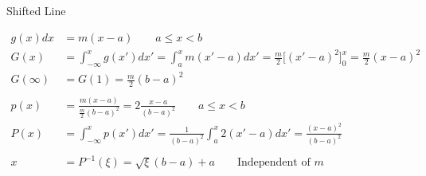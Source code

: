 \documentclass[xcolor=x11names,compress]{beamer}
\renewcommand{\(}{\begin{columns}}
\renewcommand{\)}{\end{columns}}
\newcommand{\<}[1]{\begin{column}{#1}}
\renewcommand{\>}{\end{column}}
\begin{document}
\begin{frame}{Shifted Line}

\[
  \begin{aligned}
  g(x) dx &= m(x - a) \qquad a \leq x < b\\
  G(x) &= \int_{-\infty}^x g(x')dx' = \int_a^x m(x'-a) dx' = \frac{m}{2}\bigl[(x'-a)^2 \bigr]_0^x = \frac{m}{2} (x-a)^2\\
    G(\infty) &= G(1) = \frac{m}{2}(b-a)^2\\
    \\p(x) &= \frac{m(x-a)}{\frac{m}{2}(b-a)^2} = 2 \frac{x-a}{(b-a)^2}\qquad a \leq x < b\\
    P(x) &= \int_{-\infty}^x p(x')dx' = \frac{1}{(b-a)^2}\int_a^x 2(x'-a) dx' = \frac{(x-a)^2}{(b-a)^2}\\
    &\\
    x &= P^{-1}(\xi) = \sqrt{\xi}(b-a) + a \qquad\text{Independent of }m
  \end{aligned}
\]    
    
\end{frame}
\end{document}
